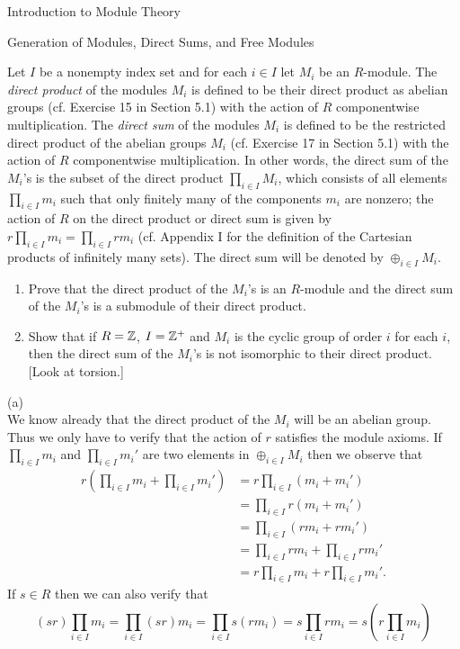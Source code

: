 \begin{chapter}{Introduction to Module Theory}
\begin{section}{Generation of Modules, Direct Sums, and Free Modules}
\begin{problem}\label{ex:10.3.20}
Let $I$ be a nonempty index set and for each $i\in I$ let $M_i$ be an $R$-module. The \emph{direct product} of the modules $M_i$ is defined to be their direct product as abelian groups (cf. Exercise 15 in Section 5.1) with the action of $R$ componentwise multiplication. The \emph{direct sum} of the modules $M_i$ is defined to be the restricted direct product of the abelian groups $M_i$ (cf. Exercise 17 in Section 5.1) with the action of $R$ componentwise multiplication. In other words, the direct sum of the $M_i$'s is the subset of the direct product $\prod_{i\in I}M_i$, which consists of all elements $\prod_{i\in I}m_i$ such that only finitely many of the components $m_i$ are nonzero; the action of $R$ on the direct product or direct sum is given by $r\prod_{i\in I}m_i = \prod_{i\in I}rm_i$ (cf. Appendix I for the definition of the Cartesian products of infinitely many sets). The direct sum will be denoted by $\oplus_{i\in I} M_i$. \begin{enumerate}
\item[(a)] Prove that the direct product of the $M_i$'s is an $R$-module and the direct sum of the $M_i$'s is a submodule of their direct product.
\item[(b)] Show that if $R=\mathbb{Z}$, $I=\mathbb{Z}^+$ and $M_i$ is the cyclic group of order $i$ for each $i$, then the direct sum of the $M_i$'s is not isomorphic to their direct product. [Look at torsion.]
\end{enumerate}
\end{problem}
\begin{solution}
(a)\\
We know already that the direct product of the $M_i$ will be an abelian group. Thus we only have to verify that the action of $r$ satisfies the module axioms. If $\prod_{i\in I}m_i$ and $\prod_{i\in I}m_i'$ are two elements in $\oplus_{i\in I} M_i$ then we observe that \begin{align*}
r\left(\prod_{i\in I}m_i+\prod_{i\in I}m_i'\right) &=r\prod_{i\in I}(m_i+m_i')\\
&=\prod_{i\in I}r(m_i+m_i')\\
&=\prod_{i\in I}(rm_i+rm_i')\\
& = \prod_{i\in I}rm_i+\prod_{i\in I}rm_i'\\
& = r\prod_{i\in I}m_i+r\prod_{i\in I}m_i'.
\end{align*}
If $s\in R$ then we can also verify that \[
(sr)\prod_{i\in I} m_i = \prod_{i\in I}(sr)m_i = \prod_{i\in I}s(rm_i) = s\prod_{i\in I}rm_i = s\left(r\prod_{i\in I}m_i\right)
\]
\end{solution}
\end{section}
\end{chapter}
